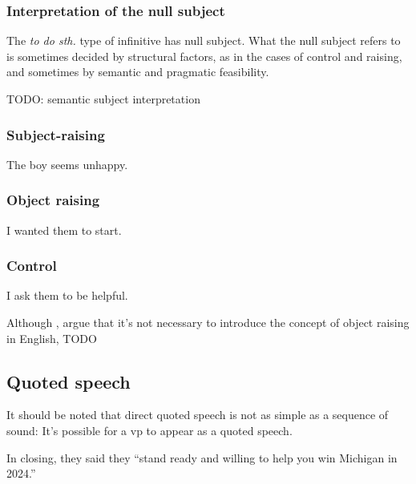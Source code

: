 \documentclass[UTF8, a4paper, oneside, scheme=plain, 12pt]{ctexbook}
\newcommand*{\citepage}[1]{p.~{#1}}
\newcommand{\form}[1]{\emph{#1}}
\begin{document}
\subsubsection{Interpretation of the null subject}

The \form{to do sth.} type of infinitive has null subject.
What the null subject refers to is sometimes decided by structural factors,
as in the cases of control and raising,
and sometimes by semantic and pragmatic feasibility.

TODO: semantic subject interpretation



\subsubsection{Subject-raising}

\begin{exe}
    \ex The boy seems unhappy.
\end{exe}

\subsubsection{Object raising}

\begin{exe}
    \ex I wanted them to start.
\end{exe}

\subsubsection{Control}

\begin{exe}
    \ex I ask them to be helpful.
\end{exe}

Although \citet[\citepage{15}]{dixon2005semantic}, \citet[\citepage{388}]{dixon2010basic2} argue that 
it's not necessary to introduce the concept of object raising in English, TODO

\subsection{Quoted speech}

It should be noted that direct quoted speech 
is not as simple as a sequence of sound:
It's possible for a \acs{vp} 
to appear as a quoted speech.

\begin{exe}
    \ex In closing, they said they ``stand ready and willing to help you win Michigan in 2024.''
\end{exe}
\end{document}
